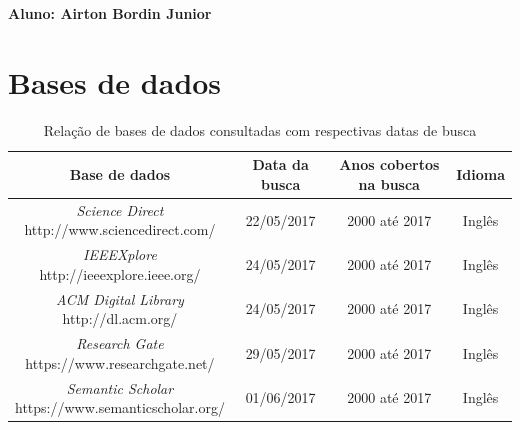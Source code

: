 \documentclass[a4paper,11pt]{article}
\begin{document}

\begin{framed}
\begin{center}
\textbf{Aluno: Airton Bordin Junior}
\end{center}
\end{framed}

\section{Bases de dados}
\begin{table}[ht]
\centering
\begin{tabular}{| c | c | c | c |}
\hline
\textbf{Base de dados} &  \textbf{Data da busca} & \textbf{Anos cobertos na busca} & \textbf{Idioma} \\
\hline
\makecell{\emph{Science Direct} \\ http://www.sciencedirect.com/} & 22/05/2017 & 2000 até 2017 & Inglês \\
\hline
\makecell{\emph{IEEEXplore} \\ http://ieeexplore.ieee.org/} & 24/05/2017 & 2000 até 2017 & Inglês \\
\hline
\makecell{\emph{ACM Digital Library} \\http://dl.acm.org/} & 24/05/2017 & 2000 até 2017 & Inglês \\
\hline
\makecell{\emph{Research Gate} \\ https://www.researchgate.net/} & 29/05/2017 & 2000 até 2017 & Inglês \\
\hline
\makecell{\emph{Semantic Scholar} \\ https://www.semanticscholar.org/} & 01/06/2017 & 2000 até 2017 & Inglês \\
\hline

\end{tabular}
\caption{Relação de bases de dados consultadas com respectivas datas de busca}
\label{tab:tab_bases}
\end{table}
\end{document}
